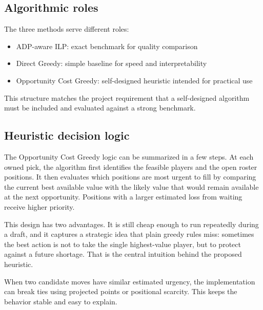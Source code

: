 \documentclass[10pt,a4paper]{article}
\begin{document}
\subsection{Algorithmic roles}

The three methods serve different roles:
\begin{itemize}[leftmargin=1.5em]
  \item ADP-aware ILP: exact benchmark for quality comparison
  \item Direct Greedy: simple baseline for speed and interpretability
  \item Opportunity Cost Greedy: self-designed heuristic intended for practical use
\end{itemize}

This structure matches the project requirement that a self-designed algorithm must be included and evaluated against a strong benchmark.

\subsection{Heuristic decision logic}

The Opportunity Cost Greedy logic can be summarized in a few steps. At each owned pick, the algorithm first identifies the feasible players and the open roster positions. It then evaluates which positions are most urgent to fill by comparing the current best available value with the likely value that would remain available at the next opportunity. Positions with a larger estimated loss from waiting receive higher priority.

This design has two advantages. It is still cheap enough to run repeatedly during a draft, and it captures a strategic idea that plain greedy rules miss: sometimes the best action is not to take the single highest-value player, but to protect against a future shortage. That is the central intuition behind the proposed heuristic.

When two candidate moves have similar estimated urgency, the implementation can break ties using projected points or positional scarcity. This keeps the behavior stable and easy to explain.
\end{document}
